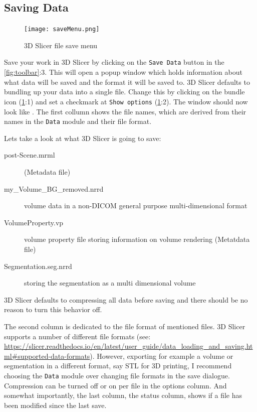 \subsection{Saving Data}
  \begin{figure}[h!]
	\centerline{
		\texttt{[image: saveMenu.png]}}
	\caption{3D Slicer file save menu}
	\label{fig:save}
\end{figure}
Save your work in 3D Slicer by clicking on the \texttt{Save Data} button in the \cref{fig:toolbar}:3.
This will open a popup window which holds information about what data will be saved and the format it will be saved to.
3D Slicer defaults to bundling up your data into a single file. Change this by clicking on the bundle icon (\cref{fig:save}:1) and set a checkmark at \texttt{Show options} (\cref{fig:save}:2).
The window should now look like .
The first collumn shows the file names, which are derived from their names in the \texttt{Data} module and their file format.

Lets take a look at what 3D Slicer is going to save:

\begin{description}
\item [post-Scene.mrml] \cite{kikinis3DSlicerPlatform2014} (Metadata file)
\item [my\_Volume\_BG\_removed.nrrd] volume data in a non-DICOM general purpose multi-dimensional format
\item [VolumeProperty.vp] volume property file storing information on volume rendering (Metatdata file)
\item [Segmentation.seg.nrrd] \cite{kikinis3DSlicerPlatform2014} storing the segmentation as a multi dimensional volume
\end{description}

3D Slicer defaults to compressing all data before saving and there should be no reason to turn this behavior off.


The second column is dedicated to the file format of mentioned files.
3D Slicer supports a number of different file formats (see: \url{https://slicer.readthedocs.io/en/latest/user_guide/data_loading_and_saving.html#supported-data-formats}).
However, exporting for example a volume or segmentation in a different format, say STL for 3D printing, I recommend choosing the \texttt{Data} module over changing file formats in the save dialogue.
Compression can be turned off or on per file in the options column.
And somewhat importantly, the last column, the status column, shows if a file has been modified since the last save.

